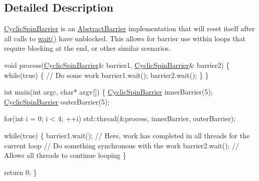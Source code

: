 \subsection{Detailed Description}
\hyperlink{class_d_x_1_1_lock_free_1_1_cyclic_spin_barrier}{Cyclic\-Spin\-Barrier} is an \hyperlink{class_d_x_1_1_lock_free_1_1_abstract_barrier}{Abstract\-Barrier} implementation that will reset itself after all calls to \hyperlink{class_d_x_1_1_lock_free_1_1_cyclic_spin_barrier_af9b42b0455c7251bda38694a2df17d11}{wait()} have unblocked. This allows for barrier use within loops that require blocking at the end, or other similar scenarios. 


\begin{DoxyCode}
\textcolor{keywordtype}{void} process(\hyperlink{class_d_x_1_1_lock_free_1_1_cyclic_spin_barrier_a857ff57e8576bee333452b0f3f3f1515}{CyclicSpinBarrier}& barrier1, \hyperlink{class_d_x_1_1_lock_free_1_1_cyclic_spin_barrier_a857ff57e8576bee333452b0f3f3f1515}{CyclicSpinBarrier}& barrier2)
\{
    \textcolor{keywordflow}{while}(\textcolor{keyword}{true})
    \{
        \textcolor{comment}{// Do some work}
        barrier1.wait();
        barrier2.wait();
    \}
\}

\textcolor{keywordtype}{int} main(\textcolor{keywordtype}{int} argc, \textcolor{keywordtype}{char}* argv[])
\{
    \hyperlink{class_d_x_1_1_lock_free_1_1_cyclic_spin_barrier_a857ff57e8576bee333452b0f3f3f1515}{CyclicSpinBarrier} innerBarrier(5);
    \hyperlink{class_d_x_1_1_lock_free_1_1_cyclic_spin_barrier_a857ff57e8576bee333452b0f3f3f1515}{CyclicSpinBarrier} outerBarrier(5);

    \textcolor{keywordflow}{for}(\textcolor{keywordtype}{int} i = 0; i < 4; ++i)
        std::thread(&process, innerBarrier, outerBarrier);

    \textcolor{keywordflow}{while}(\textcolor{keyword}{true})
    \{
        barrier1.wait();
        \textcolor{comment}{// Here, work has completed in all threads for the current loop}
        \textcolor{comment}{// Do something synchronous with the work}
        barrier2.wait();    \textcolor{comment}{// Allows all threads to continue looping}
    \}

    \textcolor{keywordflow}{return} 0;        
\}
\end{DoxyCode}
 

